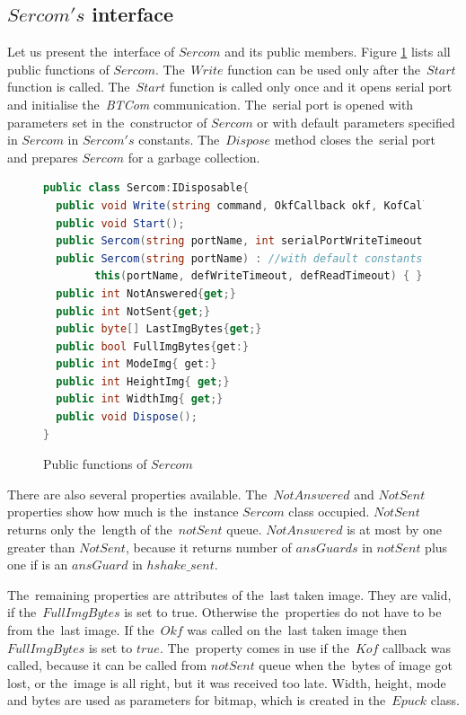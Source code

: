   \subsection{$Sercom's$ interface} %
  Let  us present the~interface of $Sercom$ and its public members.
  Figure \ref{publicser} lists all public functions of $Sercom$.
  The~$Write$ function can be used only
  after the~$Start$ function is called. The~$Start$ function is called only once and
  it opens serial port and initialise the~{\it BTCom} communication. 
  The~serial port is opened with parameters set in the~constructor of $Sercom$ or with
  default parameters specified in $Sercom$ in $Sercom's$ constants. The~$Dispose$ method closes the~serial port
  and prepares $Sercom$ for a garbage collection.

\begin{figure}[!hbp]
\begin{lstlisting}[language=cs]
public class Sercom:IDisposable{
  public void Write(string command, OkfCallback okf, KofCallback kof,object state, double timeout);
  public void Start();
  public Sercom(string portName, int serialPortWriteTimeout, int serialPortReadTimeout);
  public Sercom(string portName) : //with default constants
        this(portName, defWriteTimeout, defReadTimeout) { }
  public int NotAnswered{get;}
  public int NotSent{get;}
  public byte[] LastImgBytes{get;}
  public bool FullImgBytes{get:}
  public int ModeImg{ get:}
  public int HeightImg{ get;}
  public int WidthImg{ get;}
  public void Dispose();
}
\end{lstlisting}
\caption{Public functions of $Sercom$} \label{publicser}	
\end{figure}

  There are also several properties available. The~$NotAnswered$ and $NotSent$ properties
  show how much is the~instance $Sercom$ class occupied. $NotSent$ returns only the~length of the~$notSent$ queue. 
  $NotAnswered$ is at most by one greater than $NotSent$,
  because it returns number of $ansGuards$ in $notSent$ plus one if is an $ansGuard$ in $hshake\_sent$.

  The~remaining properties are attributes of the~last taken image. 
  They are valid, if the~$FullImgBytes$ is set to true.
  Otherwise the~properties do not have to be from the~last image.
  If the~$Okf$ was called on the~last taken image then $FullImgBytes$ is set to $true$. The~property
  comes in use if the~$Kof$ callback was called, because it can be called from $notSent$ queue  when the~bytes of image got lost, or the~image is all right, but it was received too late. 
  Width, height, mode and bytes are used as parameters for bitmap, 
  which is created in the~$Epuck$ class.

